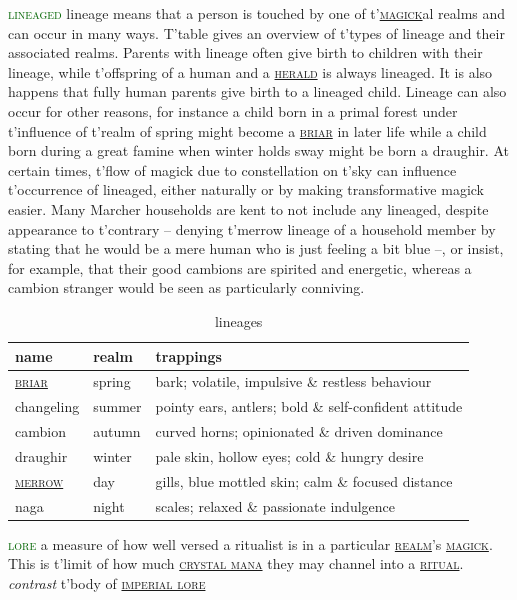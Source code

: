 \documentclass[twoside,11pt,b5paper,twocolumn]{scrbook}
\newcommand{\estcab}[1]{\textsc{\textcolor{marron}{#1}}}
\newcommand{\keyword}[1]{\textcolor{darkgreen}{#1}}
\renewcommand{\paragraph}[1]{\par\noindent\markboth{#1}{#1}\estcab{\keyword{#1}}\label{#1} }
\newcommand{\see}[1]{{\estcab{\hyperref[#1]{#1}}}}
\begin{document}
\paragraph{lineaged} lineage means that a person is touched by one of t'\see{magick}al realms and can occur in many ways. T'table gives an overview of t'types of lineage and their associated realms. Parents with lineage often give birth to children with their lineage, while t'offspring of a human and a \see{herald} is always lineaged. It is also happens that fully human parents give birth to a lineaged child. Lineage can also occur for other reasons, for instance a child born in a primal forest under t'influence of t'realm of spring might become a \see{briar} in later life while a child born during a great famine when winter holds sway might be born a draughir. At certain times, t'flow of magick due to constellation on t'sky can influence t'occurrence of lineaged, either naturally or by making transformative magick easier. Many Marcher households are kent to not include any lineaged, despite appearance to t'contrary – denying t'merrow lineage of a household member by stating that he would be a mere human who is just feeling a bit blue –, or insist, for example, that their good cambions are spirited and energetic, whereas a cambion stranger would be seen as particularly conniving.\begin{table}\begin{tabular}{lll} name& realm& trappings\\ \hline \see{briar}& spring& bark; volatile, impulsive \& restless behaviour\\ changeling& summer& pointy ears, antlers; bold \& self-confident attitude\\ cambion& autumn& curved horns; opinionated \& driven dominance\\ draughir& winter& pale skin, hollow eyes; cold \& hungry desire\\ \see{merrow}& day& gills, blue mottled skin; calm \& focused distance\\ naga& night& scales; relaxed \& passionate indulgence\end{tabular}\caption{lineages}\end{table}
\paragraph{lore} a measure of how well versed a ritualist is in a particular \see{realm}'s \see{magick}. This is t'limit of how much \see{crystal mana} they may channel into a \see{ritual}. \textit{contrast} t'body of \see{imperial lore}
\end{document}
